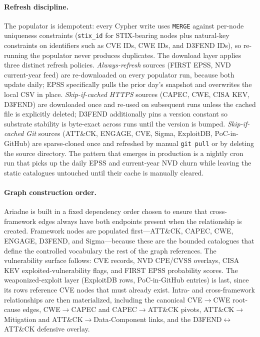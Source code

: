 \documentclass[unnumsec,webpdf,contemporary,large]{oup-authoring-template}
\theoremstyle{thmstyleone}
\theoremstyle{thmstyletwo}
\theoremstyle{thmstylethree}
\begin{document}
\paragraph{Refresh discipline.}
The populator is idempotent: every Cypher write uses \texttt{MERGE} against per-node uniqueness constraints (\texttt{stix\_id} for STIX-bearing nodes plus natural-key constraints on identifiers such as CVE IDs, CWE IDs, and D3FEND IDs), so re-running the populator never produces duplicates. The download layer applies three distinct refresh policies. \emph{Always-refresh} sources (FIRST EPSS, NVD current-year feed) are re-downloaded on every populator run, because both update daily; EPSS specifically pulls the prior day's snapshot and overwrites the local CSV in place. \emph{Skip-if-cached HTTPS} sources (CAPEC, CWE, CISA KEV, D3FEND) are downloaded once and re-used on subsequent runs unless the cached file is explicitly deleted; D3FEND additionally pins a version constant so substrate stability is byte-exact across runs until the version is bumped. \emph{Skip-if-cached Git} sources (ATT\&CK, ENGAGE, CVE, Sigma, ExploitDB, PoC-in-GitHub) are sparse-cloned once and refreshed by manual \texttt{git pull} or by deleting the source directory. The pattern that emerges in production is a nightly cron run that picks up the daily EPSS and current-year NVD churn while leaving the static catalogues untouched until their cache is manually cleared.

\paragraph{Graph construction order.}
Ariadne is built in a fixed dependency order chosen to ensure that cross-framework edges always have both endpoints present when the relationship is created. Framework nodes are populated first---ATT\&CK, CAPEC, CWE, ENGAGE, D3FEND, and Sigma---because these are the bounded catalogues that define the controlled vocabulary the rest of the graph references. The vulnerability surface follows: CVE records, NVD CPE/CVSS overlays, CISA KEV exploited-vulnerability flags, and FIRST EPSS probability scores. The weaponized-exploit layer (ExploitDB rows, PoC-in-GitHub entries) is last, since its rows reference CVE nodes that must already exist. Intra- and cross-framework relationships are then materialized, including the canonical CVE$\rightarrow$CWE root-cause edges, CWE$\rightarrow$CAPEC and CAPEC$\rightarrow$ATT\&CK pivots, ATT\&CK$\rightarrow$Mitigation and ATT\&CK$\rightarrow$Data-Component links, and the D3FEND$\leftrightarrow$ATT\&CK defensive overlay.
\end{document}
